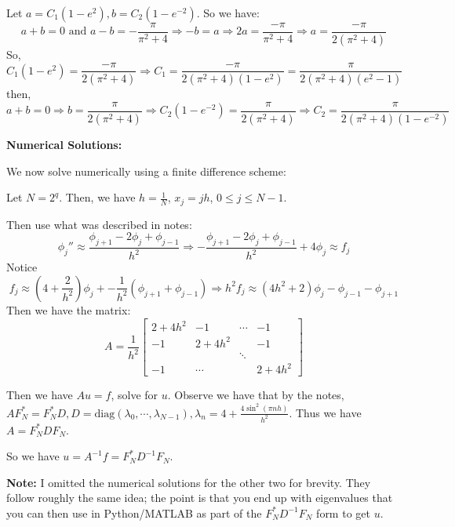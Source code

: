 \documentclass[12pt,letterpaper]{article}
\begin{document}
\medskip

Let $a= C_1(1-e^2), b= C_2(1-e^{-2})$. So we have:
\[
a+b=0\text{ and }a-b = -\frac{\pi}{\pi^2 +4} \Rightarrow -b=a \Rightarrow 2a = \frac{-\pi}{\pi^2+4} \Rightarrow a= \frac{-\pi}{2(\pi^2+4)}
\]
So,
\[
C_1(1-e^2) = \frac{-\pi }{2(\pi^2+4)}\Rightarrow C_1 = \frac{-\pi}{2(\pi^2+4)(1-e^2)}= \frac{\pi}{2(\pi^2+4)(e^2-1)}
\]
then,
\[
a+b= 0 \Rightarrow b= \frac{\pi}{2(\pi^2+4)} \Rightarrow C_2(1-e^{-2})= \frac{\pi}{2(\pi^2+4)}\Rightarrow C_2 = \frac{\pi}{2(\pi^2+4)(1-e^{-2})}
\]

    \newpage

    \textbf{Numerical Solutions:}

    \medskip

    We now solve numerically using a finite difference scheme:

    \medskip

    Let $N=2^q$. Then, we have $h = \frac{1}{N}$, $x_j = jh$, $0 \leq j \leq N-1$.

    \medskip

    Then use what was described in notes:
    \[
    \phi_j''\approx \frac{\phi_{j+1}-2\phi_j+\phi_{j-1}}{h^2} \Rightarrow -\frac{\phi_{j+1}-2\phi_j+\phi_{j-1}}{h^2}+ 4\phi_j \approx f_j
    \]
    Notice
    \[
    f_j \approx (4+\frac{2}{h^2})\phi_j + -\frac{1}{h^2}(\phi_{j+1}+\phi_{j-1}) \Rightarrow h^2f_j \approx (4h^2+2)\phi_j -\phi_{j-1}-\phi_{j+1}
    \]
    Then we have the matrix:
    \[
    A = \frac{1}{h^2}\begin{bmatrix}2+4h^2 &-1 & \cdots & -1\\ -1 & 2+4h^2 & &-1\\ & & \ddots \\-1 & \cdots & &2+4h^2\end{bmatrix}
    \]

    Then we have $Au=f$, solve for $u$. Observe we have that by the notes, $AF^*_N = F_N^* D, D = \text{diag}(\lambda_0 , \cdots, \lambda_{N-1}), \lambda_n = 4 + \frac{4 \sin^2(\pi n h)}{h^2}$. Thus we have $A = F_N^* D F_N$.

    \medskip

    So we have $u = A^{-1}f= F_N^* D^{-1}F_N$.

    \medskip

    \textbf{Note:} I omitted the numerical solutions for the other two for brevity. They follow roughly the same idea; the point is that you end up with eigenvalues that you can then use in Python/MATLAB as part of the $F_N^*D^{-1}F_N$ form to get $u$.
\end{document}
